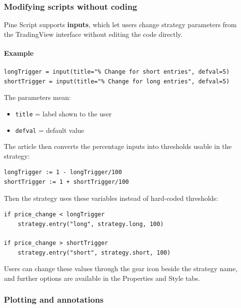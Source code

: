\documentclass[12pt,openany]{book}
\begin{document}
\subsubsection{Modifying scripts without coding}

Pine Script supports \textbf{inputs}, which let users change strategy parameters from the TradingView interface without editing the code directly.

\paragraph{Example}

\begin{Verbatim}[breaklines=true,breakanywhere=true,fontsize=\small]
longTrigger = input(title="% Change for short entries", defval=5)
shortTrigger = input(title="% Change for long entries", defval=5)
\end{Verbatim}

The parameters mean:

\begin{itemize}[leftmargin=*]
    \item \texttt{title} = label shown to the user
    \item \texttt{defval} = default value
\end{itemize}

The article then converts the percentage inputs into thresholds usable in the strategy:

\begin{Verbatim}[breaklines=true,breakanywhere=true,fontsize=\small]
longTrigger := 1 - longTrigger/100
shortTrigger := 1 + shortTrigger/100
\end{Verbatim}

Then the strategy uses these variables instead of hard-coded thresholds:

\begin{Verbatim}[breaklines=true,breakanywhere=true,fontsize=\small]
if price_change < longTrigger
    strategy.entry("long", strategy.long, 100)

if price_change > shortTrigger
    strategy.entry("short", strategy.short, 100)
\end{Verbatim}

Users can change these values through the gear icon beside the strategy name, and further options are available in the Properties and Style tabs.

\subsubsection{Plotting and annotations}
\end{document}
